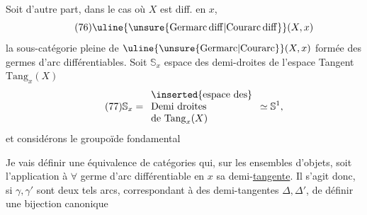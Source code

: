 
Soit d'autre part, dans le cas où $X$ est diff. en $x$, 
\[
\tag{76}
\uline{\unsure{\mathrm{Germarc\,diff}|\mathrm{Courarc\,diff}}}(X,x)
\]
la sous-catégorie pleine de  $\uline{\unsure{\mathrm{Germarc}|\mathrm{Courarc}}}(X,x)$ formée des germes d'arc différentiables. Soit $\mathbb S_x$  espace des demi-droites de l'espace Tangent $\mathrm{Tang}_x(X)$
\[
\tag{77}
\mathbb S_x=
\begin{array}{l}
\inserted{\text{espace des}}\\
\text{Demi droites}\\
\text{de }\mathrm{Tang}_x(X)
\end{array}
\simeq\mathbb S^1,
\]
et considérons le groupoïde fondamental

Je vais définir une équivalence de catégories
qui, sur les ensembles d'objets, soit l'application  à $\forall$ germe d'arc différentiable en $x$ sa demi-\uline{tangente}. Il s'agit donc, si $\gamma,\gamma'$ sont deux tels arcs, correspondant à des demi-tangentes $\Delta,\Delta'$, de définir une bijection canonique





